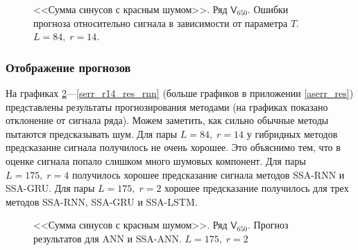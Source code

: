 \documentclass[specialist,
               substylefile = spbu.rtx,
               subf,href,colorlinks=true, 12p]{disser}
\newcommand{\multiref}[2]{\ref{#1}---\ref{#2}}
\begin{document}
\begin{figure}[H]
	\captionsetup{justification=centering}
	\caption{<<Сумма синусов с красным шумом>>. Ряд $\mathsf{V}_{650}$. Ошибки прогноза относительно сигнала в зависимости от параметра $T$. $L = 84, \; r = 14$.}
	\label{sigserr_r14}
\end{figure}

\subsubsection{Отображение прогнозов}
\label{serr_res}

На графиках \multiref{serr_r2_res_ann}{serr_r14_res_rnn} (больше графиков в приложении \ref{aserr_res}) представлены результаты прогнозирования методами (на графиках показано отклонение от сигнала ряда). Можем заметить, как сильно обычные методы пытаются предсказывать шум. Для пары $L = 84, \; r = 14$ у гибридных методов предсказание сигнала получилось не очень хорошее. Это объяснимо тем, что в оценке сигнала попало слишком много шумовых компонент. Для пары $L = 175, \; r = 4$ получилось хорошее предсказание сигнала методов SSA-RNN и SSA-GRU. Для пары $L = 175, \; r = 2$ хорошее предсказание получилось для трех методов SSA-RNN, SSA-GRU и SSA-LSTM.

\begin{figure}[H]
	\captionsetup{justification=centering}
	\caption{<<Сумма синусов с красным шумом>>. Ряд $\mathsf{V}_{650}$. Прогноз результатов для ANN и SSA-ANN. $L = 175, \; r = 2$}
	\label{serr_r2_res_ann}
\end{figure}
\end{document}

